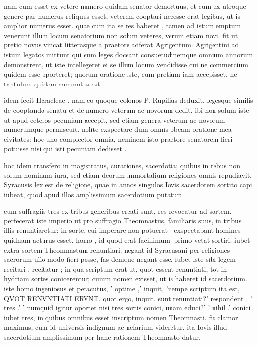  nam cum esset ex vetere numero quidam senator demortuus, et cum ex utroque genere par numerus reliquus esset, veterem cooptari necesse erat legibus, ut is amplior numerus esset. quae cum ita se res haberet , tamen ad istum emptum venerunt illum locum senatorium non solum veteres, verum etiam novi. fit ut pretio novus vincat litterasque a praetore adferat Agrigentum. Agrigentini ad istum legatos mittunt qui eum leges doceant consuetudinemque omnium annorum demonstrent, ut iste intellegeret ei se illum locum vendidisse cui ne commercium quidem esse oporteret; quorum oratione iste, cum pretium iam accepisset, ne tantulum quidem commotus est.

 idem fecit Heracleae . nam eo quoque colonos P. Rupilius deduxit, legesque similis de cooptando senatu et de numero veterum ac novorum dedit. ibi non solum iste ut apud ceteros pecuniam accepit, sed etiam genera veterum ac novorum numerumque permiscuit. nolite exspectare dum omnis obeam oratione mea civitates: hoc uno complector omnia, neminem isto praetore senatorem fieri potuisse nisi qui isti pecuniam dedisset .

 hoc idem transfero in magistratus, curationes, sacerdotia; quibus in rebus non solum hominum iura, sed etiam deorum immortalium religiones omnis repudiavit. Syracusis lex est de religione, quae in annos singulos Iovis sacerdotem sortito capi iubeat, quod apud illos amplissimum sacerdotium putatur:

 cum suffragiis tres ex tribus generibus creati sunt, res revocatur ad sortem. perfecerat iste imperio ut pro suffragio Theomnastus, familiaris suus, in tribus illis renuntiaretur: in sorte, cui imperare non potuerat , exspectabant homines quidnam acturus esset. homo , id quod erat facillimum, primo vetat sortiri: iubet extra sortem Theomnastum renuntiari. negant id Syracusani per religiones sacrorum ullo modo fieri posse, fas denique negant esse. iubet iste sibi legem recitari . recitatur ; in qua scriptum erat ut, quot essent renuntiati, tot in hydriam sortes conicerentur; cuium nomen exisset, ut is haberet id sacerdotium. iste homo ingeniosus et peracutus, ' optime ,' inquit, 'nempe scriptum ita est, QVOT RENVNTIATI ERVNT. quot ergo, inquit, sunt renuntiati?' respondent , ' tres .' ' numquid igitur oportet nisi tres sortis conici, unam educi?' ' nihil .' conici iubet tres, in quibus omnibus esset inscriptum nomen Theomnasti. fit clamor maximus, cum id universis indignum ac nefarium videretur. ita Iovis illud sacerdotium amplissimum per hanc rationem Theomnasto datur.

